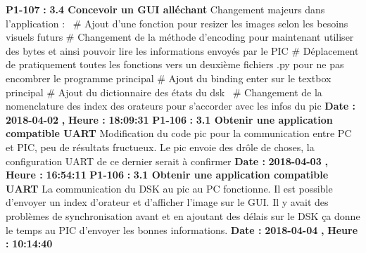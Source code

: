 \documentclass{article}%
\begin{document}
%
\textbf{P1{-}107 }%
\textbf{ : }%
\textbf{ 3.4 Concevoir un GUI alléchant}%
\newline%
\newline%
%
Changement majeurs dans l'application :~\newline%
 \# Ajout d'une fonction pour resizer les images selon les besoins visuels futurs\newline%
 \# Changement de la méthode d'encoding pour maintenant utiliser des bytes et ainsi pouvoir lire les informations envoyés par le PIC\newline%
 \# Déplacement de pratiquement toutes les fonctions vers un deuxième fichiers .py pour ne pas encombrer le programme principal\newline%
 \# Ajout du binding enter sur le textbox principal\newline%
 \# Ajout du dictionnaire des états du dsk~\newline%
 \# Changement de la nomenclature des index des orateurs pour s'accorder avec les infos du pic\newline%
\newline%
%
\textbf{Date : }%
\textbf{2018{-}04{-}02}%
\textbf{,}%
\textbf{ Heure : }%
\textbf{18:09:31}%
\newline%
%
\textbf{P1{-}106 }%
\textbf{ : }%
\textbf{ 3.1 Obtenir une application compatible UART}%
\newline%
\newline%
%
Modification du code pic pour la communication entre PC et PIC, peu de résultats fructueux. Le pic envoie des drôle de choses, la configuration UART de ce dernier serait à confirmer\newline%
\newline%
%
\textbf{Date : }%
\textbf{2018{-}04{-}03}%
\textbf{,}%
\textbf{ Heure : }%
\textbf{16:54:11}%
\newline%
%
\textbf{P1{-}106 }%
\textbf{ : }%
\textbf{ 3.1 Obtenir une application compatible UART}%
\newline%
\newline%
%
La communication du DSK au pic au PC fonctionne. Il est possible d'envoyer un index d'orateur et d'afficher l'image sur le GUI. Il y avait des problèmes de synchronisation avant et en ajoutant des délais sur le DSK ça donne le temps au PIC d'envoyer les bonnes informations.\newline%
\newline%
%
\textbf{Date : }%
\textbf{2018{-}04{-}04}%
\textbf{,}%
\textbf{ Heure : }%
\textbf{10:14:40}%
\newline%
\end{document}

